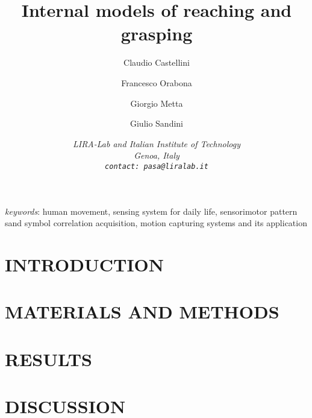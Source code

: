 \documentclass{arsubmit}
\title{Internal models of reaching and grasping}
\author{Claudio Castellini \and Francesco Orabona \and Giorgio Metta \and Giulio Sandini}
\date{\small \it{
LIRA-Lab and Italian Institute of Technology\\
Genoa, Italy\\
{\tt contact: pasa@liralab.it}
}}
\begin{document}
\maketitle

\begin{abstract}

\end{abstract}

{\it keywords}: human movement, sensing system for daily life,
sensorimotor pattern sand symbol correlation acquisition, motion
capturing systems and its application

\section{INTRODUCTION}
\label{sec:introduction}


\section{MATERIALS AND METHODS}
\label{sec:exp_desc}


\section{RESULTS}
\label{sec:exp_res}


\section{DISCUSSION}
\label{sec:Conclusions}


{\small


}
\end{document}
